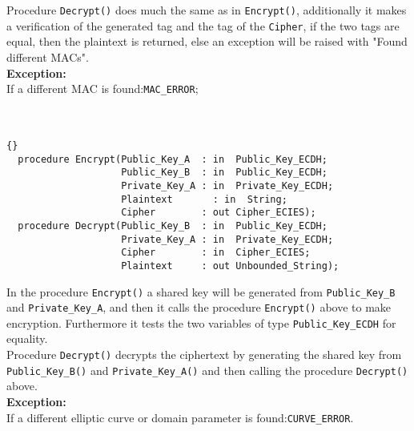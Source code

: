 Procedure \texttt{Decrypt()} does much the same as in \texttt{Encrypt()}, additionally it makes a verification of the generated tag and the tag of the \texttt{Cipher}, if the two tags are equal, then the plaintext is returned, else an exception will be raised with "Found different MACs".\\
\textbf{Exception:}\\ 
If a different MAC is found:\quad \texttt{MAC\_ERROR};\\
\hline \\ \ \\
\begin{lstlisting}{}
  procedure Encrypt(Public_Key_A  : in  Public_Key_ECDH;
                    Public_Key_B  : in  Public_Key_ECDH;
                    Private_Key_A : in  Private_Key_ECDH;
                    Plaintext	    : in  String;
                    Cipher        : out Cipher_ECIES);
  procedure Decrypt(Public_Key_B  : in  Public_Key_ECDH;
                    Private_Key_A : in  Private_Key_ECDH;
                    Cipher        : in  Cipher_ECIES;
                    Plaintext     : out Unbounded_String);
\end{lstlisting}
In the procedure \texttt{Encrypt()} a shared key will be generated from \texttt{Public\_Key\_B} and \texttt{Private\-\_Key\_A}, and then it calls the procedure \texttt{Encrypt()} above to make encryption. Furthermore it tests the two variables of type \texttt{Public\_Key\_ECDH} for equality.\\
Procedure \texttt{Decrypt()} decrypts the ciphertext by generating the shared key from \texttt{Public\_K\-ey\_B()} and \texttt{Private\_Key\_A()} and then calling the procedure \texttt{Decrypt()} above.\\
\textbf{Exception:}\\ 
If a different elliptic curve or domain parameter is found:\quad \texttt{CURVE\_ERROR}.\\
